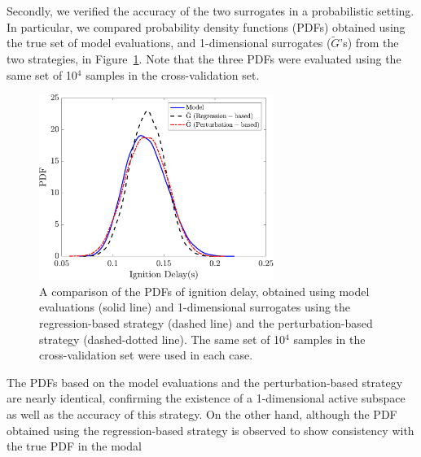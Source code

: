 Secondly, we verified the accuracy of the two surrogates in a probabilistic setting. In particular, we compared 
probability density functions (PDFs) obtained using the true set of model evaluations, and 1-dimensional
surrogates ($\tilde{G}$'s) from the two strategies, in Figure~\ref{fig:pdf_33D}. Note that the three PDFs were evaluated 
using the same set of 10$^4$ samples in the cross-validation set. 
%
\begin{figure}[htbp]
\begin{center}
\includegraphics[width=3.0in]{./Figures/pdf_comp_id_1e4}
\end{center} 
\caption{A comparison of the PDFs of ignition delay, obtained using model 
evaluations (solid line) and 1-dimensional surrogates using the regression-based strategy (dashed line) and the
perturbation-based strategy (dashed-dotted line). The same set of 10$^4$ samples in the cross-validation set were 
used in each case.}
\label{fig:pdf_33D}
\end{figure}
%
%
%
The PDFs based on the model evaluations and the perturbation-based strategy are nearly identical, confirming
the existence of a 1-dimensional active subspace as well as the accuracy of this strategy. 
On the other hand, although the PDF obtained using the regression-based strategy is observed to show
consistency with the true PDF in the modal
